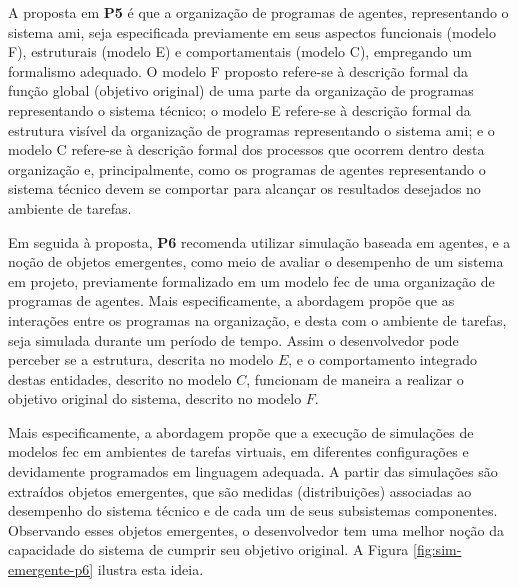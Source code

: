    A proposta em \textbf{P5} é que a organização de programas de agentes, representando o sistema \acrshort{ami}, seja especificada previamente em seus aspectos funcionais (modelo F), estruturais (modelo E) e comportamentais (modelo C), empregando um formalismo adequado. O modelo F proposto refere-se à descrição formal da função global (objetivo original) de uma parte da organização de programas representando o sistema técnico; o modelo E refere-se à descrição formal da estrutura visível da organização de programas representando o sistema \acrshort{ami}; e o modelo C refere-se à descrição formal dos processos que ocorrem dentro desta organização e, principalmente, como os programas de agentes representando o sistema técnico devem se comportar para alcançar os resultados desejados no ambiente de tarefas.
    
    Em seguida à proposta, \textbf{P6} recomenda utilizar simulação baseada em agentes, e a noção de objetos emergentes, como meio de avaliar o desempenho de um sistema em projeto, previamente formalizado em um modelo \acrshort{fec} de uma organização de programas de agentes. Mais especificamente, a abordagem propõe que as interações entre os programas na organização, e desta com o ambiente de tarefas, seja simulada durante um período de tempo. Assim o desenvolvedor pode perceber se a estrutura, descrita no modelo $E$, e o comportamento integrado destas entidades, descrito no modelo $C$, funcionam de maneira a realizar o objetivo original do sistema, descrito no modelo $F$.
    
    Mais especificamente, a abordagem propõe que a execução de simulações de modelos \acrshort{fec} em ambientes de tarefas virtuais, em diferentes configurações e devidamente programados em linguagem adequada. A partir das simulações são extraídos objetos emergentes, que são medidas (distribuições) associadas ao desempenho do sistema técnico e de cada um de seus subsistemas componentes. Observando esses objetos emergentes, o desenvolvedor tem uma melhor noção da capacidade do sistema de cumprir seu objetivo original. A Figura \ref{fig:sim-emergente-p6} ilustra esta ideia.
        
    \begin{figure}[h!]
        \centering
    \end{figure}
    
